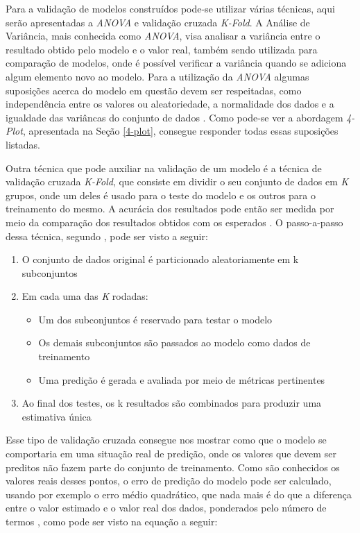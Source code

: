 Para a validação de modelos construídos pode-se utilizar várias técnicas, aqui
serão apresentadas a \textit{ANOVA} e validação cruzada \textit{K-Fold}. A
Análise de Variância, mais conhecida como \textit{ANOVA}, visa analisar a
variância entre o resultado obtido pelo modelo e o valor real, também sendo
utilizada para comparação de modelos, onde é possível verificar a variância
quando se adiciona algum elemento novo ao modelo. Para a utilização da
\textit{ANOVA} algumas suposições acerca do modelo em questão devem ser
respeitadas, como independência entre os valores ou aleatoriedade, a normalidade
dos dados e a igualdade das variâncas do conjunto de dados \cite{snedecor:1967}.
Como pode-se ver a abordagem \textit{4-Plot}, apresentada na Seção \ref{4-plot},
consegue responder todas essas suposições listadas. 

Outra técnica que pode auxiliar na validação de um modelo é a técnica de
validação cruzada \textit{K-Fold}, que consiste em dividir o seu conjunto de
dados em \textit{K} grupos, onde um deles é usado para o teste do modelo e
os outros para o treinamento do mesmo. A acurácia dos resultados pode então ser
medida por meio da comparação dos resultados obtidos com os esperados
\cite{tassia:2011}. O passo-a-passo dessa técnica, segundo
, pode ser visto a seguir:

\begin{enumerate}
  \item O conjunto de dados original é particionado aleatoriamente em k
    subconjuntos
  \item Em cada uma das \textit{K} rodadas:
    \begin{itemize}
      \item Um dos subconjuntos é reservado para testar o modelo
      \item Os demais subconjuntos são passados ao modelo como dados de treinamento
      \item Uma predição é gerada e avaliada por meio de métricas pertinentes
    \end{itemize}
  \item Ao final dos testes, os k resultados são combinados para produzir uma
    estimativa única
\end{enumerate}

Esse tipo de validação cruzada consegue nos mostrar como que o modelo se
comportaria em uma situação real de predição, onde os valores que devem ser
preditos não fazem parte do conjunto de treinamento. Como são conhecidos os valores
reais desses pontos, o erro de predição do modelo pode ser calculado, usando por
exemplo o erro médio quadrático, que nada mais é do que a diferença entre o
valor estimado e o valor real dos dados, ponderados pelo número de termos
\cite{caetano:2012}, como pode ser visto na equação a seguir:

